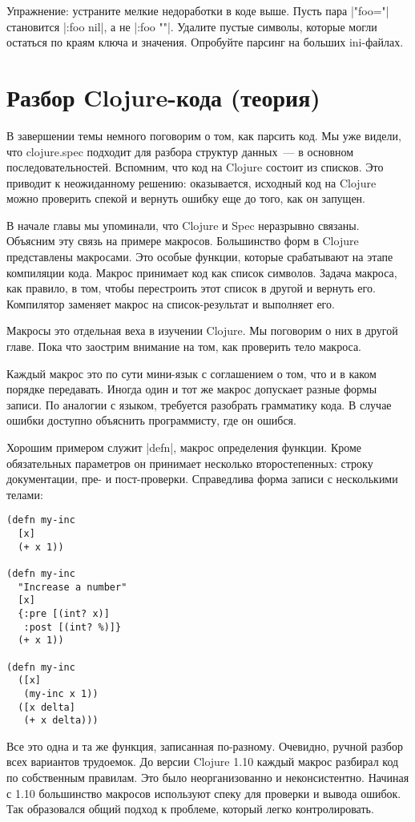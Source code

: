 Упражнение: устраните мелкие недоработки в коде выше. Пусть пара \spverb|"foo="|
становится \spverb|{:foo nil}|, а не \spverb|{:foo ""}|.  Удалите пустые символы, которые
могли остаться по краям ключа и значения. Опробуйте парсинг на больших
ini-файлах.

\section{Разбор Clojure-кода (теория)}

В завершении темы немного поговорим о том, как парсить код. Мы уже видели, что
clojure.spec подходит для разбора структур данных~--- в основном
последовательностей. Вспомним, что код на Clojure состоит из списков. Это
приводит к неожиданному решению: оказывается, исходный код на Clojure можно
проверить спекой и вернуть ошибку еще до того, как он запущен.

В начале главы мы упоминали, что Clojure и Spec неразрывно связаны. Объясним эту
связь на примере макросов. Большинство форм в Clojure представлены
макросами. Это особые функции, которые срабатывают на этапе компиляции
кода. Макрос принимает код как список символов. Задача макроса, как правило, в
том, чтобы перестроить этот список в другой и вернуть его. Компилятор заменяет
макрос на список-результат и выполняет его.

Макросы это отдельная веха в изучении Clojure. Мы поговорим о них в другой
главе. Пока что заострим внимание на том, как проверить тело макроса.

Каждый макрос это по сути мини-язык с соглашением о том, что и в каком порядке
передавать. Иногда один и тот же макрос допускает разные формы записи. По
аналогии с языком, требуется разобрать грамматику кода. В случае ошибки доступно
объяснить программисту, где он ошибся.

Хорошим примером служит \spverb|defn|, макрос определения функции. Кроме обязательных
параметров он принимает несколько второстепенных: строку документации, пре- и
пост-проверки. Справедлива форма записи с несколькими телами:

\begin{verbatim}
(defn my-inc
  [x]
  (+ x 1))

(defn my-inc
  "Increase a number"
  [x]
  {:pre [(int? x)]
   :post [(int? %)]}
  (+ x 1))

(defn my-inc
  ([x]
   (my-inc x 1))
  ([x delta]
   (+ x delta)))
\end{verbatim}

Все это одна и та же функция, записанная по-разному. Очевидно, ручной разбор
всех вариантов трудоемок. До версии Clojure 1.10 каждый макрос разбирал код по
собственным правилам. Это было неорганизованно и неконсистентно. Начиная с 1.10
большинство макросов используют спеку для проверки и вывода ошибок. Так
образовался общий подход к проблеме, который легко контролировать.

